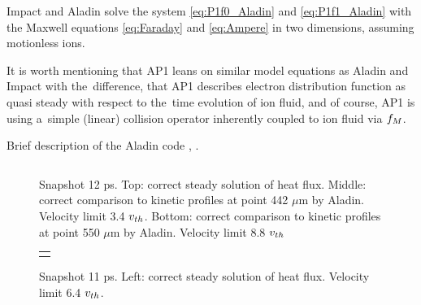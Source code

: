 Impact and Aladin solve the system \eqref{eq:P1f0_Aladin} 
and \eqref{eq:P1f1_Aladin} with the Maxwell equations  
\eqref{eq:Faraday} and \eqref{eq:Ampere} in two dimensions, 
assuming motionless ions.

It is worth mentioning that AP1 leans on similar model equations as Aladin
and Impact with the~difference, that AP1 describes electron distribution 
function as quasi steady with respect to the~time evolution of ion fluid,
and of course, AP1 is using a~simple (linear) collision operator inherently
coupled to ion fluid via $f_M$.

Brief description of the Aladin code , .




\begin{figure}[tbh]
  \begin{center}
    \begin{tabular}{c}
    \end{tabular}
  \caption{  
  Snapshot 12 ps. Top: correct steady solution of heat flux.  
  Middle: correct comparison to kinetic profiles at point 442 $\mu$m by Aladin. 
  Velocity limit 3.4 $v_{th}$.
  Bottom: correct comparison to kinetic profiles at point 550 $\mu$m by Aladin.
  Velocity limit 8.8 $v_{th}$
  }
  \label{fig:C7_Aladin_case3}
  \end{center} 
\end{figure}

\begin{figure}[tbh]
  \begin{center}
    \begin{tabular}{c}
	  \\ 
	  \\ 
    \end{tabular}
  \caption{  
  Snapshot 11 ps. Left: correct steady solution of heat flux. 
  Velocity limit 6.4 $v_{th}$.
  }
  \label{fig:C7_Calder_case1}
  \end{center} 
\end{figure}

